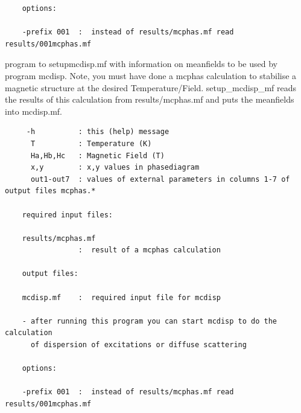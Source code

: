 \begin{description}
\begin{verbatim}
    options:

    -prefix 001  :  instead of results/mcphas.mf read results/001mcphas.mf

\end{verbatim}
\item [ \prg   setup\_mcdisp\_mf \index{setup_mcdisp_mf}\label{setup_mcdisp_mf} {[options]} T Ha Hb Hc:] 
\item [ \prg   setup\_mcdisp\_mf \index{setup_mcdisp_mf} {[options]} x y:] 
\item [ \prg   setup\_mcdisp\_mf \index{setup_mcdisp_mf} {[options]} out1 out2 out3 ou4 out5 out6 out7:] 

program to setup{\prg mcdisp.mf} with information on meanfields
                    to be used by program {\prg mcdisp}. Note, you must
                    have done a {\prg mcphas} calculation to stabilise
                    a magnetic structure at the desired Temperature/Field.
                    {\prg   setup\_mcdisp\_mf} reads the results of this calculation
                    from {\prg  results/mcphas.mf} and puts the meanfields into
                    {\prg mcdisp.mf}.


\begin{verbatim}
     -h          : this (help) message
      T          : Temperature (K)
      Ha,Hb,Hc   : Magnetic Field (T)
      x,y        : x,y values in phasediagram
      out1-out7  : values of external parameters in columns 1-7 of output files mcphas.*

    required input files:

    results/mcphas.mf
                 :  result of a mcphas calculation

    output files:

    mcdisp.mf    :  required input file for mcdisp

    - after running this program you can start mcdisp to do the calculation
      of dispersion of excitations or diffuse scattering

    options:

    -prefix 001  :  instead of results/mcphas.mf read results/001mcphas.mf

\end{verbatim}


\end{description}
